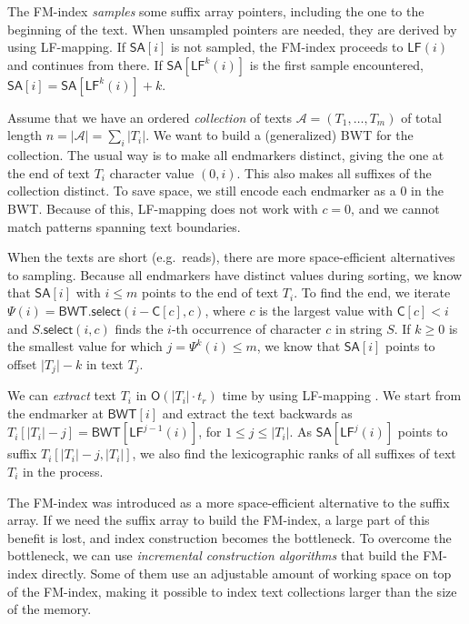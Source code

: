 \documentclass[smallabstract,smallcaptions]{dccpaper}
\newcommand{\abs}[1]{\ensuremath{\lvert #1 \rvert}}
\newcommand{\Oh}{\ensuremath{\mathsf{O}}}
\newcommand{\BWT}{\textsf{BWT}}
\newcommand{\mSA}{\ensuremath{\mathsf{SA}}}
\newcommand{\mBWT}{\ensuremath{\mathsf{BWT}}}
\newcommand{\mC}{\ensuremath{\mathsf{C}}}
\newcommand{\LF}{\textsf{LF}}
\newcommand{\mLF}{\ensuremath{\mathsf{LF}}}
\newcommand{\mselect}{\ensuremath{\mathsf{select}}}
\newcommand{\Acoll}{\ensuremath{\mathcal{A}}}
\begin{document}
The FM-index \emph{samples} some suffix array pointers, including the one to the beginning of the text. When unsampled pointers are needed, they are derived by using \LF\nobreakdash-mapping. If $\mSA[i]$ is not sampled, the FM-index proceeds to $\mLF(i)$ and continues from there. If $\mSA[\mLF^{k}(i)]$ is the first sample encountered, $\mSA[i] = \mSA[\mLF^{k}(i)] + k$.

Assume that we have an ordered \emph{collection} of texts $\Acoll = (T_{1}, \dotsc, T_{m})$ of total length $n = \abs{\Acoll} = \sum_{i} \abs{T_{i}}$. We want to build a (generalized) \BWT{} for the collection. The usual way is to make all endmarkers distinct, giving the one at the end of text $T_{i}$ character value $(0,i)$. This also makes all suffixes of the collection distinct. To save space, we still encode each endmarker as a $0$ in the \BWT{}. Because of this, \LF\nobreakdash-mapping does not work with $c = 0$, and we cannot match patterns spanning text boundaries.

When the texts are short (e.g.~reads), there are more space-efficient alternatives to sampling. Because all endmarkers have distinct values during sorting, we know that $\mSA[i]$ with $i \le m$ points to the end of text $T_{i}$. To find the end, we iterate $\Psi(i) = \mBWT.\mselect(i - \mC[c], c)$, where $c$ is the largest value with $\mC[c] < i$ and $S.\mselect(i,c)$ finds the $i$\nobreakdash-th occurrence of character $c$ in string $S$. If $k \ge 0$ is the smallest value for which $j = \Psi^{k}(i) \le m$, we know that $\mSA[i]$ points to offset $\abs{T_{j}} - k$ in text $T_{j}$.

We can \emph{extract} text $T_{i}$ in $\Oh(\abs{T_{i}} \cdot t_{r})$ time by using \LF\nobreakdash-mapping \cite{Burrows1994}. We start from the endmarker at $\mBWT[i]$ and extract the text backwards as $T_{i}[\abs{T_{i}} - j] = \mBWT[\LF^{j-1}(i)]$, for $1 \le j \le \abs{T_{i}}$. As $\mSA[\LF^{j}(i)]$ points to suffix $T_{i}[\abs{T_{i}}-j, \abs{T_{i}}]$, we also find the lexicographic ranks of all suffixes of text $T_{i}$ in the process.


\Section{Space-efficient \BWT{} construction}

The FM-index was introduced as a more space-efficient alternative to the suffix array. If we need the suffix array to build the FM-index, a large part of this benefit is lost, and index construction becomes the bottleneck. To overcome the bottleneck, we can use \emph{incremental construction algorithms} that build the FM-index directly. Some of them use an adjustable amount of working space on top of the FM-index, making it possible to index text collections larger than the size of the memory.
\end{document}
